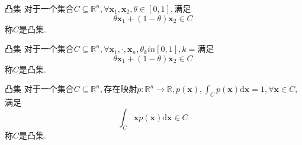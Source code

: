 
\begin{definition}{凸集}
对于一个集合$C\subseteq\mathbb{R}^n,\forall\boldsymbol{x}_1,\boldsymbol{x}_2,\theta\in[0,1],$满足
$$\theta\boldsymbol{x}_1+(1-\theta)\boldsymbol{x}_2\in C~$$
称$C$是凸集.
\end{definition}
\begin{definition}{凸集}
对于一个集合$C\subseteq\mathbb{R}^n,\forall\boldsymbol{x}_1,\cdot,\boldsymbol{x}_n,\theta_kin[0,1],k=$满足
$$\theta\boldsymbol{x}_1+(1-\theta)\boldsymbol{x}_2\in C~$$
称$C$是凸集.
\end{definition}
\begin{definition}{凸集}
对于一个集合$C\subseteq\mathbb{R}^n,$存在映射$p:\mathbb{R}^n\to\mathbb{R},p(\boldsymbol{x}),\int_Cp(\boldsymbol{x})\mathrm{d}\boldsymbol{x}=1,\forall\boldsymbol{x}\in C,$满足
$$\int_C\boldsymbol{x}p(\boldsymbol{x})\mathrm{d}\boldsymbol{x}\in C~$$
称$C$是凸集.
\end{definition}